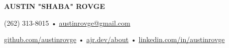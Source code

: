 \centering\textbf{\LARGE AUSTIN "SHABA" ROVGE}

\centering(262) 313-8015 • \href{mailto:austinrovge@gmail.com}{austinrovge@gmail.com}

\centering\href{https://github.com/austinrovge}{github.com/austinrovge} • \href{https://ajr.dev/about}{ajr.dev/about} • \href{https://linkedin.com/in/austinrovge}{linkedin.com/in/austinrovge}
